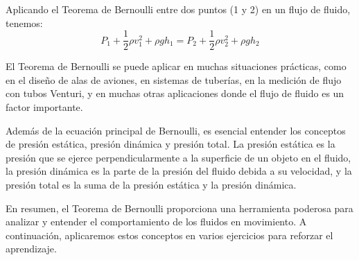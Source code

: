 \documentclass[../main]{subfiles}
\begin{document}
Aplicando el Teorema de Bernoulli entre dos puntos (1 y 2) en un flujo de fluido, tenemos:
\begin{equation}
P_1 + \frac{1}{2} \rho v_1^2 + \rho g h_1 = P_2 + \frac{1}{2} \rho v_2^2 + \rho g h_2
\end{equation}

El Teorema de Bernoulli se puede aplicar en muchas situaciones prácticas, como en el diseño de alas de aviones, en sistemas de tuberías, en la medición de flujo con tubos Venturi, y en muchas otras aplicaciones donde el flujo de fluido es un factor importante.

Además de la ecuación principal de Bernoulli, es esencial entender los conceptos de presión estática, presión dinámica y presión total. La presión estática es la presión que se ejerce perpendicularmente a la superficie de un objeto en el fluido, la presión dinámica es la parte de la presión del fluido debida a su velocidad, y la presión total es la suma de la presión estática y la presión dinámica.

En resumen, el Teorema de Bernoulli proporciona una herramienta poderosa para analizar y entender el comportamiento de los fluidos en movimiento. A continuación, aplicaremos estos conceptos en varios ejercicios para reforzar el aprendizaje.
\end{document}

